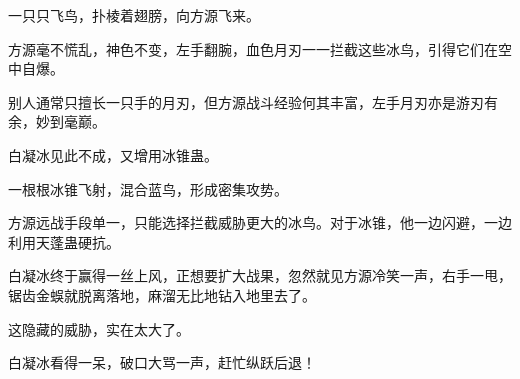 \begin{this_body}
一只只飞鸟，扑棱着翅膀，向方源飞来。

方源毫不慌乱，神色不变，左手翻腕，血色月刃一一拦截这些冰鸟，引得它们在空中自爆。

别人通常只擅长一只手的月刃，但方源战斗经验何其丰富，左手月刃亦是游刃有余，妙到毫巅。

白凝冰见此不成，又增用冰锥蛊。

一根根冰锥飞射，混合蓝鸟，形成密集攻势。

方源远战手段单一，只能选择拦截威胁更大的冰鸟。对于冰锥，他一边闪避，一边利用天蓬蛊硬抗。

白凝冰终于赢得一丝上风，正想要扩大战果，忽然就见方源冷笑一声，右手一甩，锯齿金蜈就脱离落地，麻溜无比地钻入地里去了。

这隐藏的威胁，实在太大了。

白凝冰看得一呆，破口大骂一声，赶忙纵跃后退！

\end{this_body}

